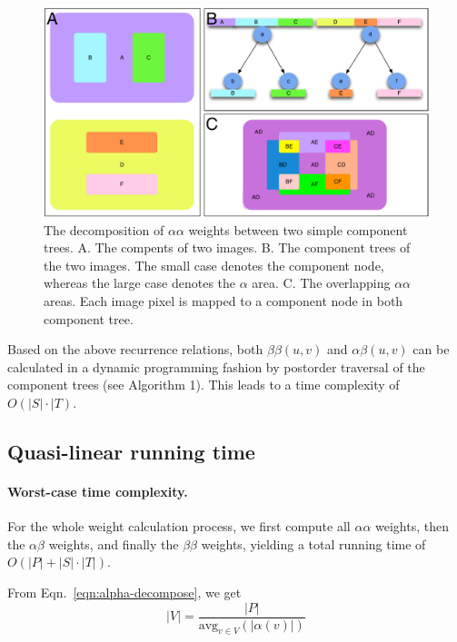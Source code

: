 \begin{figure}[htbp]
\centering
\includegraphics[width=1.0\textwidth]{images/cptree_aaweight}
\caption[The decomposition of $\alpha\alpha$ weights between two simple component
trees.]{The decomposition of $\alpha\alpha$ weights between two simple component
trees. A. The compents of two images. B. The component trees of the two images. 
The small case denotes the component node, whereas the large case denotes the $\alpha$
area. C. The overlapping $\alpha\alpha$ areas. Each image pixel is mapped to a 
component node in both component tree.}
\label{fig:cptree-aaweight}
\end{figure}

Based on the above recurrence relations, both $\beta\beta(u,v)$ and
$\alpha\beta(u,v)$ can be calculated in a dynamic programming fashion by
postorder traversal of the component trees (see Algorithm 1). This leads to a
time complexity of $O(|S| \cdot |T)$.  

\subsection{Quasi-linear running time}
\paragraph{Worst-case time complexity.} For the whole weight calculation
process, we first compute all $\alpha\alpha$ weights, then the
$\alpha\beta$ weights, and finally the $\beta\beta$ weights, yielding
a total running time of $O(|P| + |S|\cdot|T|)$.  

\def\avg{\mathrm{avg}}

From Eqn.~\eqref{eqn:alpha-decompose}, we get
\begin{equation*}
|V| = \frac{|P|}{\avg_{v\in V}(|\alpha(v)|)} 
\end{equation*}

